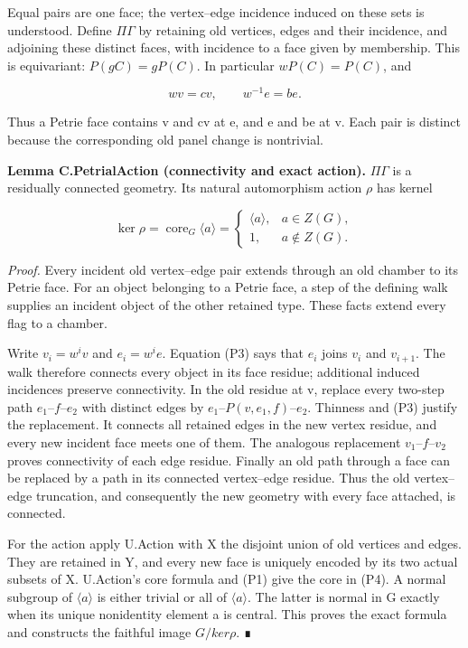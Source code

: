 \documentclass[
  11pt,
  a4paper,
]{article}
\begin{document}
Equal pairs are one face; the vertex--edge incidence induced on these
sets is understood. Define \(\Pi \Gamma\) by retaining old vertices,
edges and their incidence, and adjoining these distinct faces, with
incidence to a face given by membership. This is equivariant:
\(P(gC)=gP(C)\). In particular \(wP(C)=P(C)\), and

\[
 wv=cv,\qquad w^{-1}e=be.
 \tag{P3}
\]

Thus a Petrie face contains v and cv at e, and e and be at v. Each pair
is distinct because the corresponding old panel change is nontrivial.

\textbf{Lemma C.PetrialAction (connectivity and exact action).}
\(\Pi \Gamma\) is a residually connected geometry. Its natural
automorphism action \(\rho\) has kernel

\[
 \ker\rho=\operatorname{core}_G\langle a\rangle
 =\begin{cases}\langle a\rangle,&a\in Z(G),\\1,&a\notin Z(G).\end{cases}
 \tag{P4}
\]

\emph{Proof.} Every incident old vertex--edge pair extends through an
old chamber to its Petrie face. For an object belonging to a Petrie
face, a step of the defining walk supplies an incident object of the
other retained type. These facts extend every flag to a chamber.

Write \(v_i=w^iv\) and \(e_i=w^ie\). Equation (P3) says that \(e_i\)
joins \(v_i\) and \(v_{i+1}\). The walk therefore connects every object
in its face residue; additional induced incidences preserve
connectivity. In the old residue at v, replace every two-step path
\(e_{1}–f–e_{2}\) with distinct edges by \(e_{1}–P(v,e_{1},f)–e_{2}\).
Thinness and (P3) justify the replacement. It connects all retained
edges in the new vertex residue, and every new incident face meets one
of them. The analogous replacement \(v_{1}–f–v_{2}\) proves connectivity
of each edge residue. Finally an old path through a face can be replaced
by a path in its connected vertex--edge residue. Thus the old
vertex--edge truncation, and consequently the new geometry with every
face attached, is connected.

For the action apply U.Action with X the disjoint union of old vertices
and edges. They are retained in Y, and every new face is uniquely
encoded by its two actual subsets of X. U.Action's core formula and (P1)
give the core in (P4). A normal subgroup of \(\langle a\rangle\) is
either trivial or all of \(\langle a\rangle\). The latter is normal in G
exactly when its unique nonidentity element a is central. This proves
the exact formula and constructs the faithful image \(G/ker\rho\). ∎
\end{document}
